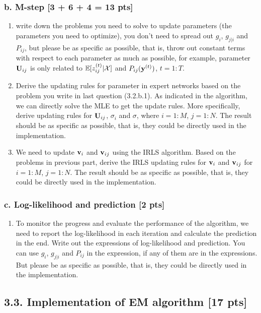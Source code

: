 \subsubsection*{b. M-step [3 + 6 + 4 = 13 pts]}

\begin{enumerate}
\item write down the problems you need to solve to update parameters (the parameters you need to optimize), you don't need to spread out $g_i$, $g_{j|i}$ and $P_{ij}$, but please be as specific as possible, that is, throw out constant terms with respect to each parameter as much as possible, for example, parameter $\mathbf{U}_{ij}$ is only related to $\mathbb{E}[z_{ij}^{(t)}|\mathcal{X}]$ and $P_{ij}(\mathbf{y}^{(t)})$, $t=1:T$. 

\item Derive the updating rules for parameter in expert networks based on the problem you write in last question (3.2.b.1). As indicated in the algorithm, we can directly solve the MLE to get the update rules. More specifically, derive updating rules for $\mathbf{U}_{ij}$, $\sigma_i$ and $\sigma$, where $i=1:M$, $j=1:N$. The result should be as specific as possible, that is, they could be directly used in the implementation.  

\item We need to update $\mathbf{v}_i$ and $\mathbf{v}_{ij}$ using the IRLS algorithm. Based on the problems in previous part, derive the IRLS updating rules for $\mathbf{v}_i$ and $\mathbf{v}_{ij}$ for $i=1:M$, $j=1:N$. The result should be as specific as possible, that is, they could be directly used in the implementation.  
\end{enumerate}

\subsubsection*{c. Log-likelihood and prediction [2 pts]}
\begin{enumerate}
\item To monitor the progress and evaluate the performance of the algorithm, we need to report the log-likelihood in each iteration and calculate the prediction in the end. Write out the expressions of log-likelihood and prediction. You can use $g_i$, $g_{j|i}$ and $P_{ij}$ in the expression, if any of them are in the expressions. But please be as specific as possible, that is, they could be directly used in the implementation.  
\end{enumerate}

\subsection*{3.3. Implementation of EM algorithm [17 pts]}

